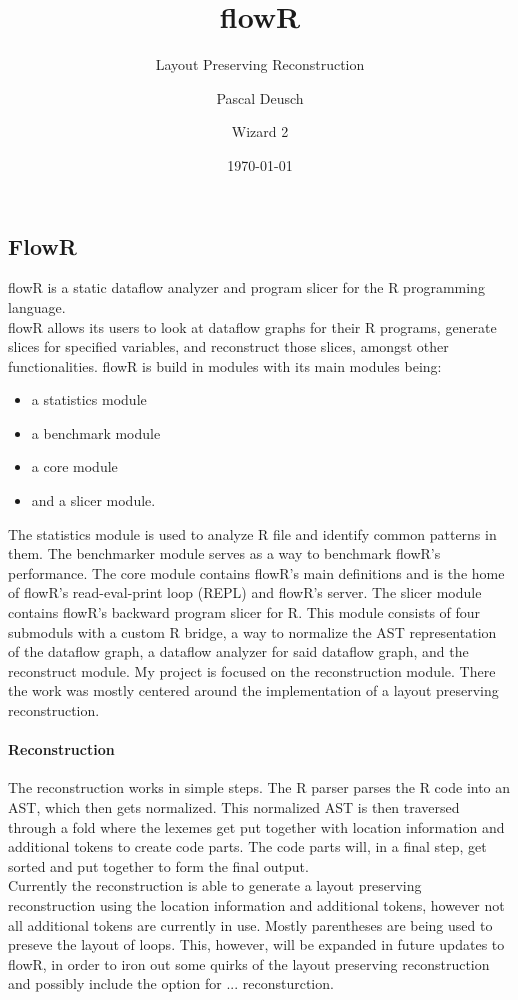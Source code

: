 \documentclass[a3paper, portrait, english, default]{uulm-cs-poster}
\title{flowR}
\subtitle{Layout Preserving Reconstruction}
\author{Pascal Deusch\and Wizard 2}
\institute{Institut für Software Engineering und Programiersprachen}
\date{\today}
\begin{document}
\maketitle
\begin{multicols}{2}
\section*{FlowR}
	flowR is a static dataflow analyzer and program slicer for the R programming language.\\%
	flowR allows its users to look at dataflow graphs for their R programs, generate slices for specified variables, and reconstruct those slices, amongst other functionalities.
	flowR is build in modules with its main modules being:
   \begin{itemize}
      \item a statistics module
      \item a benchmark module
	  \item a core module
      \item and a slicer module.
   \end{itemize}
	The statistics module is used to analyze R file and identify common patterns in them. The benchmarker module serves as a way to benchmark flowR's performance.
	The core module contains flowR's main definitions and is the home of flowR's read-eval-print loop (REPL) and flowR's server. The slicer module contains flowR's backward program slicer for R. This module consists of four submoduls with a custom R bridge, a way to normalize the AST representation of the dataflow graph, a dataflow analyzer for said dataflow graph, and the reconstruct module.
	My project is focused on the reconstruction module. There the work was mostly centered around the implementation of a layout preserving reconstruction.
	\paragraph{Reconstruction}
	The reconstruction works in simple steps. The R parser parses the R code into an AST, which then gets normalized. This normalized AST is then traversed through a fold where the lexemes get put together with location information and additional tokens to create code parts. The code parts will, in a final step, get sorted and put together to form the final output.\\
	Currently the reconstruction is able to generate a layout preserving reconstruction using the location information and additional tokens, however not all additional tokens are currently in use. Mostly parentheses are being used to preseve the layout of loops. This, however, will be expanded in future updates to flowR, in order to iron out some quirks of the layout preserving reconstruction and possibly include the option for ... reconsturction.

\end{multicols}
\end{document}
